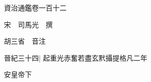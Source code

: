 






























































資治通鑑卷一百十二

宋　司馬光　撰

胡三省　音注

晉紀三十四|{
	起重光赤奮若盡玄黓攝提格凡二年}


安皇帝下

